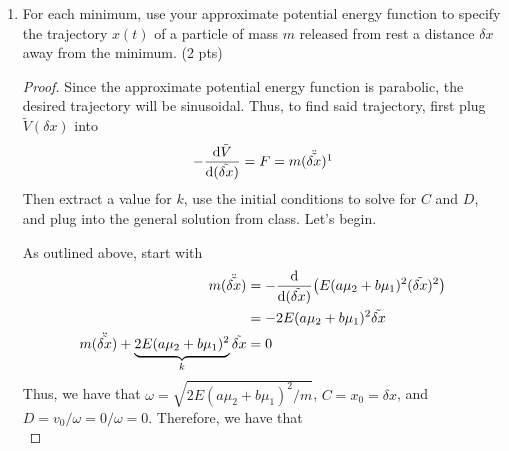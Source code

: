 \documentclass[../psets.tex]{subfiles}
\begin{document}
\begin{enumerate}
\begin{enumerate}
\begin{proof}
\begin{align*}
            \end{align*}
            Therefore, the desired condition is
            \begin{equation*}
                \boxed{|\delta x| \ll \frac{a\mu_2+b\mu_1}{6\mu_1\mu_2}}
            \end{equation*}
            Moreover, as in part (B), because $V'''(x)$ is an odd function about the line of reflection of $V(x)$, we have that $V'''(-a/\mu_1)=-V'''(b/\mu_2)$. Therefore, since we take an absolute value of the constraint into which we plug $V'''(b/\mu_2)$, the above expression is actually applicable to the minimum at $x=b/\mu_2$ as well.
        \end{proof}
        \item For each minimum, use your approximate potential energy function to specify the trajectory $x(t)$ of a particle of mass $m$ released from rest a distance $\delta x$ away from the minimum. (2 pts)
        \begin{proof}
            Since the approximate potential energy function is parabolic, the desired trajectory will be sinusoidal. Thus, to find said trajectory, first plug $\tilde{V}(\delta x)$ into
            \begin{equation*}
                -\dv{\tilde{V}}{(\tilde{\delta x})} = F = m(\ddot{\tilde{\delta x}})\footnotemark
            \end{equation*}
            Then extract a value for $k$, use the initial conditions to solve for $C$ and $D$, and plug into the general solution from class. Let's begin.\par
            As outlined above, start with
            \begin{align*}
                m(\ddot{\tilde{\delta x}}) &= -\dv{(\tilde{\delta x})}(E(a\mu_2+b\mu_1)^2(\tilde{\delta x})^2)\\
                &= -2E(a\mu_2+b\mu_1)^2\tilde{\delta x}\\
                m(\ddot{\tilde{\delta x}})+\underbrace{2E(a\mu_2+b\mu_1)^2}_k\tilde{\delta x} &= 0
            \end{align*}
            Thus, we have that $\omega=\sqrt{2E(a\mu_2+b\mu_1)^2/m}$, $C=x_0=\delta x$, and $D=v_0/\omega=0/\omega=0$. Therefore, we have that
            \begin{equation*}

\end{equation*}
\end{proof}
\end{enumerate}
\end{enumerate}
\end{document}

